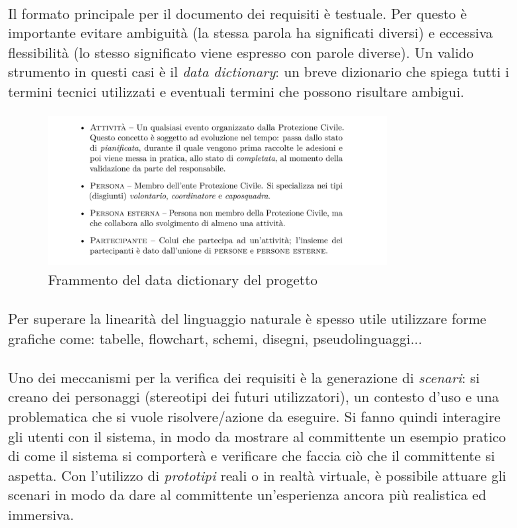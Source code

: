 \documentclass[12pt,a4paper,twoside,english,italian]{book}
\begin{document}
\paragraph{} Il formato principale per il documento dei requisiti è testuale. Per questo è importante evitare ambiguità (la stessa parola ha significati diversi) e eccessiva flessibilità (lo stesso significato viene espresso con parole diverse). Un valido strumento in questi casi è il \emph{data dictionary}: un breve dizionario che spiega tutti i termini tecnici utilizzati e eventuali termini che possono risultare ambigui. 


\begin{figure}[H]
    \centering
    \includegraphics[width=0.8\textwidth]{img/data_dictionary.png}
    \caption{Frammento del data dictionary del progetto}
\end{figure}


\paragraph{} Per superare la linearità del linguaggio naturale è spesso utile utilizzare forme grafiche come: tabelle, flowchart, schemi, disegni, pseudolinguaggi... 

\paragraph{} Uno dei meccanismi per la verifica dei requisiti è la generazione di \emph{scenari}: si creano dei personaggi (stereotipi dei futuri utilizzatori), un contesto d'uso e una problematica che si vuole risolvere/azione da eseguire. Si fanno quindi interagire gli utenti con il sistema, in modo da mostrare al committente un esempio pratico di come il sistema si comporterà e verificare che faccia ciò che il committente si aspetta. Con l'utilizzo di \emph{prototipi} reali o in realtà virtuale, è possibile attuare gli scenari in modo da dare al committente un'esperienza ancora più realistica ed immersiva.
\end{document}
